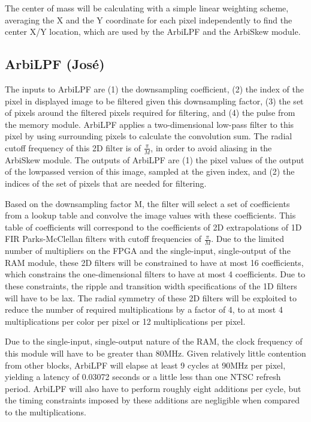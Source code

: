 \documentclass[10pt]{article}
\begin{document}
The center of mass will be calculating with a simple linear weighting scheme, averaging the X and the Y coordinate for each pixel independently to find the center X/Y location, which are used by the ArbiLPF and the ArbiSkew module.

\subsection{ArbiLPF (Jos\'{e})}
The inputs to ArbiLPF are (1) the downsampling coefficient, (2) the index of the pixel in displayed image to be filtered given this downsampling factor, (3) the set of pixels around the filtered pixels required for filtering, and (4) the pulse from the memory module. ArbiLPF applies a two-dimensional low-pass filter to this pixel by using surrounding pixels to calculate the convolution sum. The radial cutoff frequency of this 2D filter is of \( \frac{\pi}{M} \), in order to avoid aliasing in the ArbiSkew module. The outputs of ArbiLPF are (1) the pixel values of the output of the lowpassed version of this image, sampled at the given index, and (2) the indices of the set of pixels that are needed for filtering.

Based on the downsampling factor M, the filter will select a set of coefficients from a lookup table and convolve the image values with these coefficients. This table of coefficients will correspond to the coefficients of 2D extrapolations of 1D FIR Parks-McClellan filters with cutoff frequencies of \( \frac{\pi}{M} \). Due to the limited number of multipliers on the FPGA and the single-input, single-output of the RAM module, these 2D filters will be constrained to have at most 16 coefficients, which constrains the one-dimensional filters to have at most 4 coefficients. Due to these constraints, the ripple and transition width specifications of the 1D filters will have to be lax. The radial symmetry of these 2D filters will be exploited to reduce the number of required multiplications by a factor of 4, to at most 4 multiplications per color per pixel or 12 multiplications per pixel.

Due to the single-input, single-output nature of the RAM, the clock frequency of this module will have to be greater than 80MHz. Given relatively little contention from other blocks, ArbiLPF will elapse at least 9 cycles at 90MHz per pixel, yielding a latency of 0.03072 seconds or a little less than one NTSC refresh period. ArbiLPF will also have to perform roughly eight additions per cycle, but the timing constraints imposed by these additions are negligible when compared to the multiplications.
\end{document}
